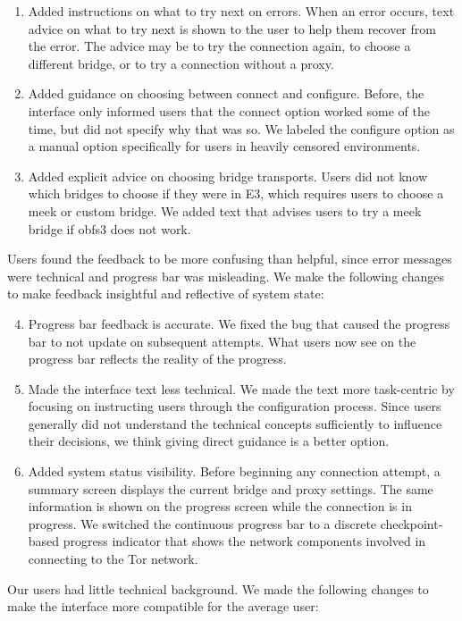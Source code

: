 \documentclass[USenglish,oneside,twocolumn]{article}
\begin{document}
\begin{enumerate}
\item Added instructions on what to try next on errors. When an error occurs, text advice on what to try next is shown to the user to help them recover from the error. The advice may be to try the connection again, to choose a different bridge, or to try a connection without a proxy. 
\item Added guidance on choosing between connect and configure. Before, the interface only informed users that the connect option worked some of the time, but did not specify why that was so. We labeled the configure option as a manual option  specifically for users in heavily censored environments.
\item Added explicit advice on choosing bridge transports. Users did not know which bridges to choose if they were in E3, which requires users to choose a meek or custom bridge. We added text that advises users to try a meek bridge if obfs3 does not work.
\end{enumerate} 

Users found the feedback to be more confusing than helpful, since error messages were technical and progress bar was misleading. We make the following changes to make feedback insightful and reflective of system state:\\ 
\begin{enumerate}
\setcounter{enumi}{3}
\item Progress bar feedback is accurate.  We fixed the bug that caused the progress bar to not update on subsequent attempts. What users now see on the progress bar reflects the reality of the progress. 
\item Made the interface text less technical. We made the text more task-centric by focusing on instructing users through the configuration process. Since users generally did not understand the technical concepts sufficiently to influence their decisions, we think giving direct guidance is a better option. 
\item Added system status visibility. Before beginning any connection attempt, a summary screen displays the current bridge and proxy settings. The same information is shown on the progress screen while the connection is in progress. We switched the continuous progress bar to a discrete checkpoint-based progress indicator that shows the network components involved in connecting to the Tor network.
\end{enumerate}

Our users had little technical background. We made the following changes to make the interface more compatible for the average user: \\
\end{document}
